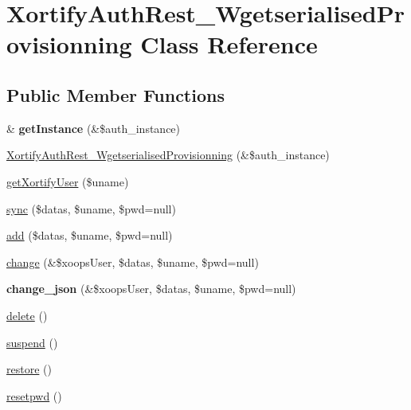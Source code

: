 \hypertarget{class_xortify_auth_rest___wgetserialised_provisionning}{\section{Xortify\-Auth\-Rest\-\_\-\-Wgetserialised\-Provisionning Class Reference}
\label{class_xortify_auth_rest___wgetserialised_provisionning}
}
\subsection*{Public Member Functions}
\begin{DoxyCompactItemize}
\item 
\hypertarget{class_xortify_auth_rest___wgetserialised_provisionning_a2c8eaa915c70d75289ac8a03686194f9}{\& {\bfseries get\-Instance} (\&\$auth\-\_\-instance)}\label{class_xortify_auth_rest___wgetserialised_provisionning_a2c8eaa915c70d75289ac8a03686194f9}

\item 
\hyperlink{class_xortify_auth_rest___wgetserialised_provisionning_a527aad8711de2a1c67cb93b4621b1fb3}{Xortify\-Auth\-Rest\-\_\-\-Wgetserialised\-Provisionning} (\&\$auth\-\_\-instance)
\item 
\hyperlink{class_xortify_auth_rest___wgetserialised_provisionning_a041d726ac26672547ed1504e8e0117aa}{get\-Xortify\-User} (\$uname)
\item 
\hyperlink{class_xortify_auth_rest___wgetserialised_provisionning_a35dc08b0f2138eb818ff95345b73bcff}{sync} (\$datas, \$uname, \$pwd=null)
\item 
\hyperlink{class_xortify_auth_rest___wgetserialised_provisionning_adfc9fcef01e7bd7b2f47e8e79d51fc63}{add} (\$datas, \$uname, \$pwd=null)
\item 
\hyperlink{class_xortify_auth_rest___wgetserialised_provisionning_ae1f0971b9712c794620cf309164e43af}{change} (\&\$xoops\-User, \$datas, \$uname, \$pwd=null)
\item 
\hypertarget{class_xortify_auth_rest___wgetserialised_provisionning_a94f4e0408f26e65abca347ec883f4ec9}{{\bfseries change\-\_\-json} (\&\$xoops\-User, \$datas, \$uname, \$pwd=null)}\label{class_xortify_auth_rest___wgetserialised_provisionning_a94f4e0408f26e65abca347ec883f4ec9}

\item 
\hyperlink{class_xortify_auth_rest___wgetserialised_provisionning_a13bdffdd926f26b825ea57066334ff01}{delete} ()
\item 
\hyperlink{class_xortify_auth_rest___wgetserialised_provisionning_ad73006a505121228f3b075c2409787d2}{suspend} ()
\item 
\hyperlink{class_xortify_auth_rest___wgetserialised_provisionning_aa1371f22826cf8cde4454c9b467203d0}{restore} ()
\item 
\hyperlink{class_xortify_auth_rest___wgetserialised_provisionning_a06d70fbd3a2db390b6f2530c0076628e}{resetpwd} ()
\end{DoxyCompactItemize}
